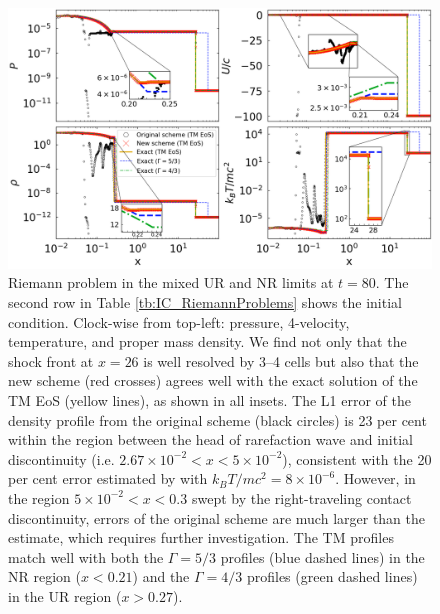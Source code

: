\begin{figure}
\includegraphics[width=\linewidth]{srhd-figures/RiemannProbs.png}
\centering
\caption{Riemann problem in the mixed UR and NR limits at $t=80$. The second row in Table \ref{tb:IC_RiemannProblems} shows the initial condition. Clock-wise from top-left: pressure, 4-velocity, temperature, and proper mass density. We find not only that the shock front at $x=26$ is well resolved by 3--4 cells but also that the new scheme (red crosses) agrees well with the exact solution of the TM EoS (yellow lines), as shown in all insets. The L1 error of the density profile from the original scheme (black circles) is 23 per cent within the region between the head of rarefaction wave and initial discontinuity (i.e. $2.67\times 10^{-2}<x<5\times10^{-2}$), consistent with the 20 per cent error estimated by  with $k_{B}T/mc^2=8\times10^{-6}$. However, in the region $5\times10^{-2}<x<0.3$ swept by the right-traveling contact discontinuity, errors of the original scheme are much larger than the estimate, which requires further investigation. The TM profiles match well with both the $\Gamma=5/3$ profiles (blue dashed lines) in the NR region ($x<0.21$) and the $\Gamma=4/3$ profiles (green dashed lines) in the UR region ($x>0.27$).}
\label{fig:non-relativistic shock tube}
\end{figure}

